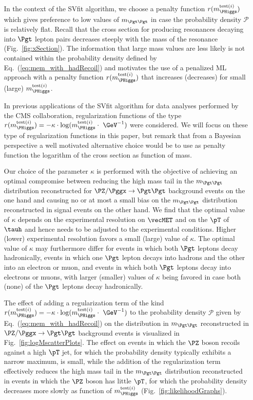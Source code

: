 In the context of the SVfit algorithm, we choose a penalty function $r(m_{\PHiggs}^{\textrm{test}(i)})$
which gives preference to low values of $m_{\Pgt\Pgt}$ 
in case the probability density $\mathcal{P}$ 
is relatively flat.
Recall that the cross section for producing resonances decaying into $\Pgt$ lepton pairs 
decreases steeply with the mass of the resonance (\cf Fig.~\ref{fig:xSection}).
The information that large mass values are less likely is not contained within the probability density defined by Eq.~(\ref{eq:mem_with_hadRecoil})
and motivates the use of a penalized ML approach with a penalty function $r(m_{\PHiggs}^{\textrm{test}(i)})$ 
that increases (decreases) for small (large) $m_{\PHiggs}^{\textrm{test}(i)}$.

In previous applications of the SVfit algorithm for data analyses performed by the CMS collaboration,
regularization functions of the type 
$r(m_{\PHiggs}^{\textrm{test}(i)}) = -\kappa \cdot \log(m_{\PHiggs}^{\textrm{test}(i)} \cdot \mbox{~\GeV}^{-1})$ were considered.
We will focus on these type of regularization functions in this paper,
but remark that from a Bayesian perspective a well motivated alternative choice 
would be to use as penalty function the logarithm of the cross section as function of mass.

Our choice of the parameter $\kappa$ is performed with the objective of achieving an
optimal compromise between reducing the high mass tail in the $m_{\Pgt\Pgt}$ distribution reconstructed for 
$\PZ/\Pggx \to \Pgt\Pgt$ background events on the one hand and 
causing no or at most a small bias on the $m_{\Pgt\Pgt}$ distribution
reconstructed in signal events on the other hand.
We find that the optimal value of $\kappa$ depends on the experimental
resolution on $\vecMET$ and on the $\pT$ of $\tauh$ and hence needs to be adjusted to the experimental conditions.
Higher (lower) experimental resolution favors a small (large) value of $\kappa$. 
The optimal value of $\kappa$ may furthermore differ 
for events in which both $\Pgt$ leptons decay hadronically,
events in which one $\Pgt$ lepton decays into hadrons and the other into an electron or muon,
and events in which both $\Pgt$ leptons decay into electrons or muons,
with larger (smaller) values of $\kappa$ being favored in case both (none) of the $\Pgt$ leptons decay hadronically.

The effect of adding a regularization term of the kind 
$r(m_{\PHiggs}^{\textrm{test}(i)}) = -\kappa \cdot \log(m_{\PHiggs}^{\textrm{test}(i)} \cdot \mbox{~\GeV}^{-1})$ 
to the probability density $\mathcal{P}$ given by Eq.~(\ref{eq:mem_with_hadRecoil})
on the distribution in $m_{\Pgt\Pgt}$ reconstructed in $\PZ/\Pggx \to \Pgt\Pgt$ background events
is visualized in Fig.~\ref{fig:logMscatterPlots}.
The effect on events in which the $\PZ$ boson recoils against a high $\pT$ jet, for which the probability density typically exhibits a narrow maximum, is small, 
while the addition of the regularization term effectively reduces the high mass tail in the $m_{\Pgt\Pgt}$ distribution reconstructed in
events in which the $\PZ$ boson has little $\pT$,
for which the probability density decreases more slowly as function of $m_{\PHiggs}^{\textrm{test}(i)}$ (\cf Fig.~\ref{fig:likelihoodGraphs}).

